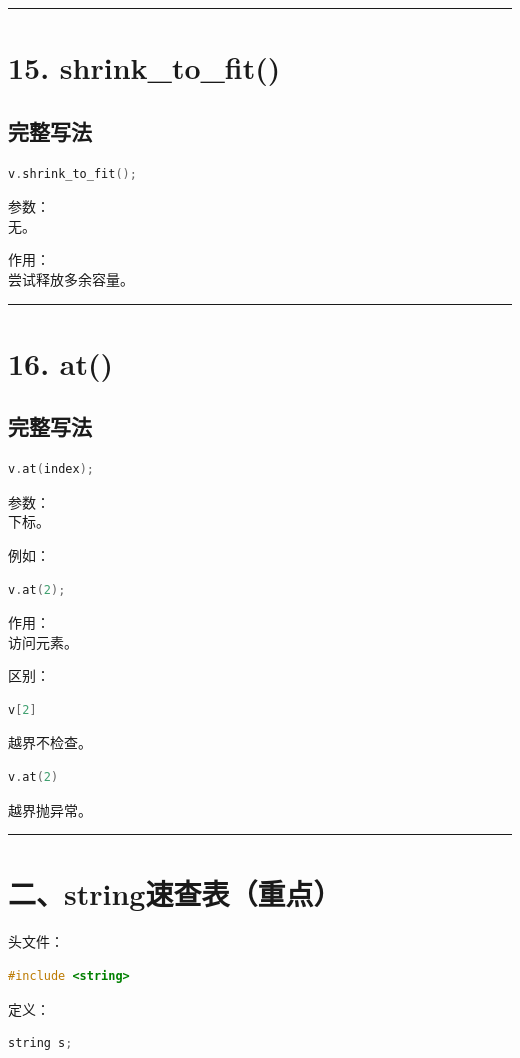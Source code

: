 \documentclass[9pt,twocolumn]{extarticle}
\begin{document}
\noindent\rule{\linewidth}{0.4pt}

\section{15. shrink\_to\_fit()}

\subsection{完整写法}
\begin{lstlisting}[language=C++]
v.shrink_to_fit();
\end{lstlisting}
参数：\\
无。

作用：\\
尝试释放多余容量。

\noindent\rule{\linewidth}{0.4pt}

\section{16. at()}

\subsection{完整写法}
\begin{lstlisting}[language=C++]
v.at(index);
\end{lstlisting}
参数：\\
下标。

例如：
\begin{lstlisting}[language=C++]
v.at(2);
\end{lstlisting}
作用：\\
访问元素。

区别：
\begin{lstlisting}[language=C++]
v[2]
\end{lstlisting}
越界不检查。
\begin{lstlisting}[language=C++]
v.at(2)
\end{lstlisting}
越界抛异常。

\noindent\rule{\linewidth}{0.4pt}

\section{二、string速查表（重点）}

头文件：
\begin{lstlisting}[language=C++]
#include <string>
\end{lstlisting}
定义：
\begin{lstlisting}[language=C++]
string s;
\end{lstlisting}
\end{document}
